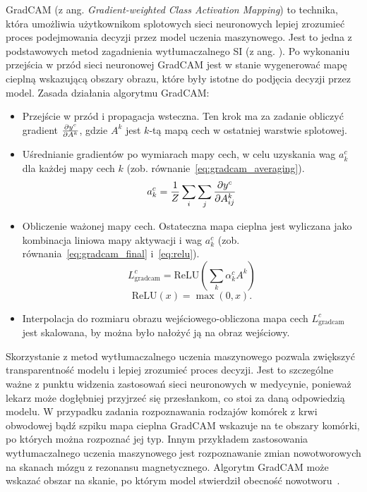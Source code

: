 GradCAM (z ang. \textit{Gradient-weighted Class Activation Mapping}) to technika, która umożliwia użytkownikom splotowych sieci neuronowych lepiej zrozumieć proces podejmowania decyzji przez model uczenia maszynowego.
Jest to jedna z podstawowych metod zagadnienia wytłumaczalnego SI (z ang. ).
Po wykonaniu przejścia w przód sieci neuronowej GradCAM jest w stanie wygenerować mapę cieplną wskazującą obszary obrazu, które były istotne do podjęcia decyzji przez model.
Zasada działania algorytmu GradCAM:
\begin{itemize}
    \item Przejście w przód i propagacja wsteczna.
    Ten krok ma za zadanie obliczyć gradient $\frac{\partial{{y^c}}}{\partial{{A^k}}}$, gdzie $A^k$ jest $k$-tą mapą cech w ostatniej warstwie splotowej.
    \item Uśrednianie gradientów po wymiarach mapy cech, w celu uzyskania wag $a^c_k$ dla każdej mapy cech $k$ (zob.
    równanie~\ref{eq:gradcam_averaging}).
    \begin{equation}
        a^c_k = \frac{1}{Z} \sum_i \sum_j \frac{\partial{{y^c}}}{\partial{{A^k_{ij}}}}\label{eq:gradcam_averaging}
    \end{equation}
    \item Obliczenie ważonej mapy cech.
    Ostateczna mapa cieplna jest wyliczana jako kombinacja liniowa mapy aktywacji i wag $a^c_k$ (zob.
    równania~\ref{eq:gradcam_final} i~\ref{eq:relu}).
    \begin{equation}
        L^c_{\text{gradcam}} = \text{ReLU} \left( \sum_k \alpha^c_k A^k \right)\label{eq:gradcam_final}
    \end{equation}
    \begin{equation}
        \text{ReLU}(x) = \max(0, x).\label{eq:relu}
    \end{equation}
    \item Interpolacja do rozmiaru obrazu wejściowego-obliczona mapa cech $L^c_{\text{gradcam}}$ jest skalowana, by można było nałożyć ją na obraz wejściowy.
\end{itemize}

Skorzystanie z metod wytłumaczalnego uczenia maszynowego pozwala zwiększyć transparentność modelu i lepiej zrozumieć proces decyzji.
Jest to szczególne ważne z punktu widzenia zastosowań sieci neuronowych w medycynie, ponieważ lekarz może dogłębniej przyjrzeć się przesłankom, co stoi za daną odpowiedzią modelu.
W przypadku zadania rozpoznawania rodzajów komórek z krwi obwodowej bądź szpiku mapa cieplna GradCAM wskazuje na te obszary komórki, po których można rozpoznać jej typ.
Innym przykładem zastosowania wytłumaczalnego uczenia maszynowego jest rozpoznawanie zmian nowotworowych na skanach mózgu z rezonansu magnetycznego.
Algorytm GradCAM może wskazać obszar na skanie, po którym model stwierdził obecność nowotworu~\cite{gradcam_brain_tumor}.